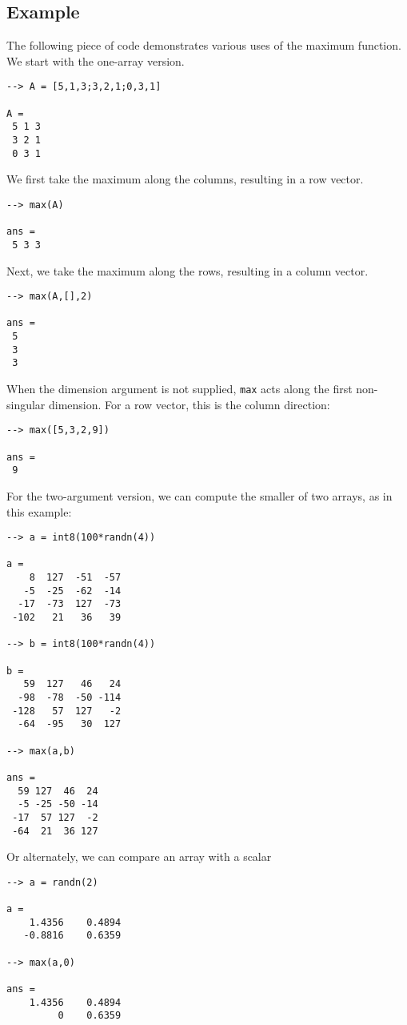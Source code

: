 \subsection{Example}

The following piece of code demonstrates various uses of the maximum
function.  We start with the one-array version.
\begin{verbatim}
--> A = [5,1,3;3,2,1;0,3,1]

A = 
 5 1 3 
 3 2 1 
 0 3 1 
\end{verbatim}
We first take the maximum along the columns, resulting in a row vector.
\begin{verbatim}
--> max(A)

ans = 
 5 3 3 
\end{verbatim}
Next, we take the maximum along the rows, resulting in a column vector.
\begin{verbatim}
--> max(A,[],2)

ans = 
 5 
 3 
 3 
\end{verbatim}
When the dimension argument is not supplied, \verb|max| acts along the first non-singular dimension.  For a row vector, this is the column direction:
\begin{verbatim}
--> max([5,3,2,9])

ans = 
 9 
\end{verbatim}

For the two-argument version, we can compute the smaller of two arrays,
as in this example:
\begin{verbatim}
--> a = int8(100*randn(4))

a = 
    8  127  -51  -57 
   -5  -25  -62  -14 
  -17  -73  127  -73 
 -102   21   36   39 

--> b = int8(100*randn(4))

b = 
   59  127   46   24 
  -98  -78  -50 -114 
 -128   57  127   -2 
  -64  -95   30  127 

--> max(a,b)

ans = 
  59 127  46  24 
  -5 -25 -50 -14 
 -17  57 127  -2 
 -64  21  36 127 
\end{verbatim}
Or alternately, we can compare an array with a scalar
\begin{verbatim}
--> a = randn(2)

a = 
    1.4356    0.4894 
   -0.8816    0.6359 

--> max(a,0)

ans = 
    1.4356    0.4894 
         0    0.6359 
\end{verbatim}
